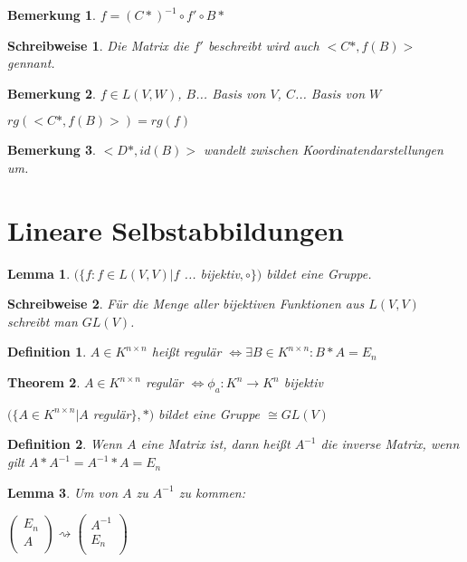 \documentclass[twocolumn]{article}
\newtheorem{theorem}{Theorem}[section]
\newtheorem{lemma}[theorem]{Lemma}
\newtheorem{definition}{Definition}[section]
\newtheorem*{remark}{Bemerkung}
\newtheorem*{schreibweise}{Schreibweise}
\newcommand*{\logeq}{\Leftrightarrow}
\begin{document}
\begin{remark}
	$f = (C*)^{-1}\circ f' \circ B*$
\end{remark}

\begin{schreibweise}
	Die Matrix die $f'$ beschreibt wird auch $<C*,f(B)>$ gennant.
\end{schreibweise}

\begin{remark}
	$f \in L(V,W)$, $B$... Basis von $V$, $C$... Basis von $W$
	
	$rg(<C*,f(B)>)=rg(f)$
\end{remark}

\begin{remark}
	$<D*,id(B)>$ wandelt zwischen Koordinatendarstellungen um.
\end{remark}

\section{Lineare Selbstabbildungen}
\begin{lemma}
	$(\{f:f\in L(V,V) | f$ ... bijektiv$, \circ\})$ bildet eine Gruppe.
\end{lemma}

\begin{schreibweise}
	Für die Menge aller bijektiven Funktionen aus $L(V,V)$ schreibt man $GL(V)$.
\end{schreibweise}

\begin{definition}
	$A \in K^{n\times n}$ heißt regulär $\logeq \exists B \in K^{n \times n} : B * A = E_n$
\end{definition}

\begin{theorem}
	$A \in K^{n \times n}$ regulär $\logeq \phi_a : K^n \rightarrow K^n$ bijektiv
	
	$(\{A \in K^{n \times n} | A $ regulär$\}, *)$ bildet eine Gruppe $\cong GL(V)$
\end{theorem}

\begin{definition}
	Wenn $A$ eine Matrix ist, dann heißt $A^{-1}$ die inverse Matrix, wenn gilt $A*A^{-1} = A^{-1} * A = E_n$
\end{definition}

\begin{lemma}
	Um von $A$ zu $A^{-1}$ zu kommen:
	
	$\begin{pmatrix}
		E_n \\
		A \\
	\end{pmatrix}
	\rightsquigarrow
	\begin{pmatrix}
		A^{-1} \\
		E_n \\
	\end{pmatrix}$
\end{lemma}
\end{document}
